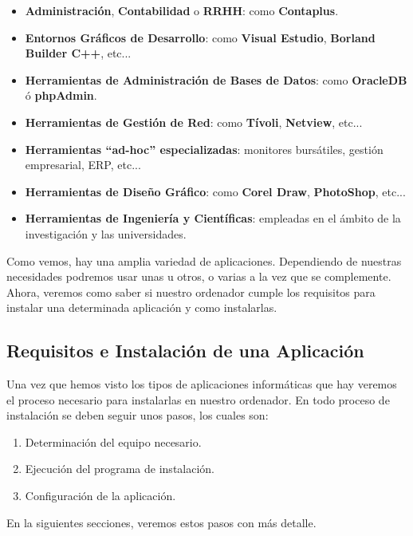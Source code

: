 \begin{itemize}
    \begin{itemize}
        \item \textbf{Administración}, \textbf{Contabilidad} o \textbf{RRHH}: como \textbf{Contaplus}.
        \item \textbf{Entornos Gráficos de Desarrollo}: como \textbf{Visual Estudio}, \textbf{Borland Builder C++}, etc...
        \item \textbf{Herramientas de Administración de Bases de Datos}: como \textbf{OracleDB} ó \textbf{phpAdmin}.
        \item \textbf{Herramientas de Gestión de Red}: como \textbf{Tívoli}, \textbf{Netview}, etc...
        \item \textbf{Herramientas ``ad-hoc'' especializadas}: monitores bursátiles, gestión empresarial, ERP, etc...
        \item \textbf{Herramientas de Diseño Gráfico}: como \textbf{Corel Draw}, \textbf{PhotoShop}, etc...
        \item \textbf{Herramientas de Ingeniería y Científicas}: empleadas en el ámbito de la investigación y las universidades.
    \end{itemize}
\end{itemize}

Como vemos, hay una amplia variedad de aplicaciones. Dependiendo de nuestras necesidades podremos usar unas u otros, o varias a la vez que se complemente. Ahora, veremos como saber si nuestro ordenador cumple los requisitos para instalar una determinada aplicación y como instalarlas.

\subsection{Requisitos e Instalación de una Aplicación}
Una vez que hemos visto los tipos de aplicaciones informáticas que hay veremos el proceso necesario para instalarlas en nuestro ordenador. En todo proceso de instalación se deben seguir unos pasos, los cuales son:

\begin{enumerate}
    \item Determinación del equipo necesario.
    \item Ejecución del programa de instalación.
    \item Configuración de la aplicación.
\end{enumerate}

En la siguientes secciones, veremos estos pasos con más detalle.

